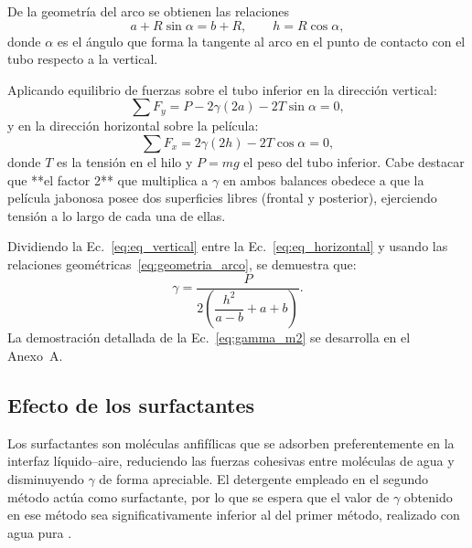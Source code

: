De la geometría del arco se obtienen las relaciones
\begin{equation}
    a + R\sin\alpha = b + R, \qquad h = R\cos\alpha,
    \label{eq:geometria_arco}
\end{equation}
donde $\alpha$ es el ángulo que forma la tangente al arco en el punto de
contacto con el tubo respecto a la vertical.

Aplicando equilibrio de fuerzas sobre el tubo inferior en la dirección
vertical:
\begin{equation}
    \sum F_y = P - 2\gamma(2a) - 2T\sin\alpha = 0,
    \label{eq:eq_vertical}
\end{equation}
y en la dirección horizontal sobre la película:
\begin{equation}
    \sum F_x = 2\gamma(2h) - 2T\cos\alpha = 0,
    \label{eq:eq_horizontal}
\end{equation}
donde $T$ es la tensión en el hilo y $P = mg$ el peso del tubo inferior. Cabe destacar que **el factor 2** que multiplica a $\gamma$ en ambos balances obedece a que la película jabonosa posee dos superficies libres (frontal y posterior), ejerciendo tensión a lo largo de cada una de ellas.

Dividiendo la Ec.~\eqref{eq:eq_vertical} entre la
Ec.~\eqref{eq:eq_horizontal} y usando las relaciones
geométricas~\eqref{eq:geometria_arco}, se demuestra que:
\begin{equation}
    \gamma = \frac{P}{2 \left( \dfrac{h^{2}}{a - b} + a + b \right)}.
    \label{eq:gamma_m2}
\end{equation}
La demostración detallada de la Ec.~\eqref{eq:gamma_m2} se desarrolla en el
Anexo~A.

\subsection{Efecto de los surfactantes}

Los surfactantes son moléculas anfifílicas que se adsorben preferentemente en
la interfaz líquido--aire, reduciendo las fuerzas cohesivas entre moléculas de
agua y disminuyendo $\gamma$ de forma apreciable. El detergente empleado en el
segundo método actúa como surfactante, por lo que se espera que el valor de
$\gamma$ obtenido en ese método sea significativamente inferior al del primer
método, realizado con agua pura \cite{serway}.